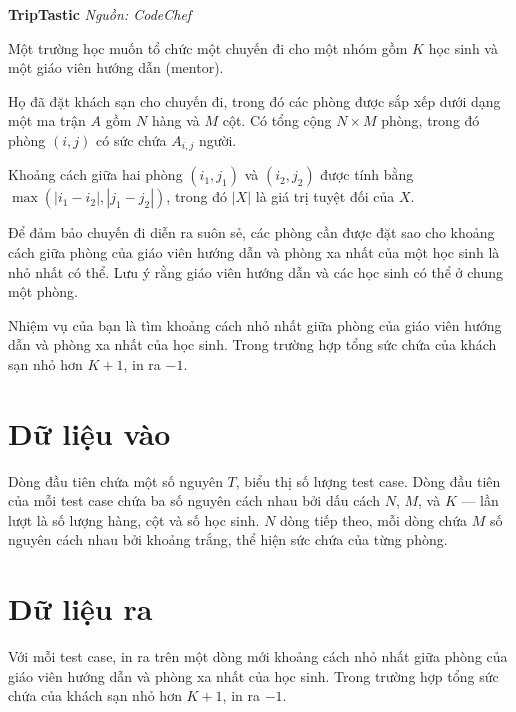\documentclass[12pt,a4paper]{article}
\newcommand{\problem}[2]{%
  \addcontentsline{toc}{section}{#1}%
  \begin{mdframed}[
    linecolor=framecolor,
    linewidth=1.5pt,
    backgroundcolor=white,
    topline=true, bottomline=true,
    leftline=true, rightline=true,
    innerleftmargin=10pt, innerrightmargin=10pt,
    innertopmargin=6pt, innerbottommargin=6pt,
  ]
  \textbf{\large #1} \hfill \textit{Nguồn: #2}
  \end{mdframed}
  \vspace{4pt}%
}
\begin{document}
\newpage







\problem{TripTastic}{CodeChef}

Một trường học muốn tổ chức một chuyến đi cho một nhóm gồm $K$ học sinh và một giáo viên hướng dẫn (mentor).

Họ đã đặt khách sạn cho chuyến đi, trong đó các phòng được sắp xếp dưới dạng một ma trận $A$ gồm $N$ hàng và $M$ cột. Có tổng cộng $N \times M$ phòng, trong đó phòng $(i, j)$ có sức chứa $A_{i,j}$ người.

Khoảng cách giữa hai phòng $(i_1, j_1)$ và $(i_2, j_2)$ được tính bằng $\max(|i_1 - i_2|, |j_1 - j_2|)$, trong đó $|X|$ là giá trị tuyệt đối của $X$.

Để đảm bảo chuyến đi diễn ra suôn sẻ, các phòng cần được đặt sao cho khoảng cách giữa phòng của giáo viên hướng dẫn và phòng xa nhất của một học sinh là nhỏ nhất có thể. Lưu ý rằng giáo viên hướng dẫn và các học sinh có thể ở chung một phòng.

Nhiệm vụ của bạn là tìm khoảng cách nhỏ nhất giữa phòng của giáo viên hướng dẫn và phòng xa nhất của học sinh. Trong trường hợp tổng sức chứa của khách sạn nhỏ hơn $K + 1$, in ra $-1$.

\section*{Dữ liệu vào}
Dòng đầu tiên chứa một số nguyên $T$, biểu thị số lượng test case.
Dòng đầu tiên của mỗi test case chứa ba số nguyên cách nhau bởi dấu cách $N$, $M$, và $K$ — lần lượt là số lượng hàng, cột và số học sinh.
$N$ dòng tiếp theo, mỗi dòng chứa $M$ số nguyên cách nhau bởi khoảng trắng, thể hiện sức chứa của từng phòng.

\section*{Dữ liệu ra}
Với mỗi test case, in ra trên một dòng mới khoảng cách nhỏ nhất giữa phòng của giáo viên hướng dẫn và phòng xa nhất của học sinh.
Trong trường hợp tổng sức chứa của khách sạn nhỏ hơn $K + 1$, in ra $-1$.
\end{document}
